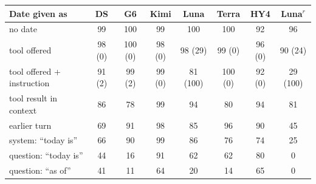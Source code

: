 \begin{tabular}{@{}lccccccc@{}}
\toprule
Date given as & DS & G6 & Kimi & Luna & Terra & HY4 & Luna$^r$ \\
\midrule
no date & 99 & 100 & 99 & 100 & 100 & 92 & 96 \\
tool offered & 98 (0) & 100 (0) & 98 (0) & 98 (29) & 99 (0) & 96 (0) & 90 (24) \\
tool offered + instruction & 91 (2) & 99 (2) & 99 (0) & 81 (100) & 100 (0) & 92 (0) & 29 (100) \\
tool result in context & 86 & 78 & 99 & 94 & 80 & 94 & 81 \\
earlier turn & 69 & 91 & 98 & 85 & 96 & 90 & 45 \\
system: ``today is'' & 66 & 90 & 99 & 86 & 76 & 74 & 25 \\
question: ``today is'' & 44 & 16 & 91 & 62 & 62 & 80 & 0 \\
question: ``as of'' & 41 & 11 & 64 & 20 & 14 & 65 & 0 \\
\bottomrule
\end{tabular}
